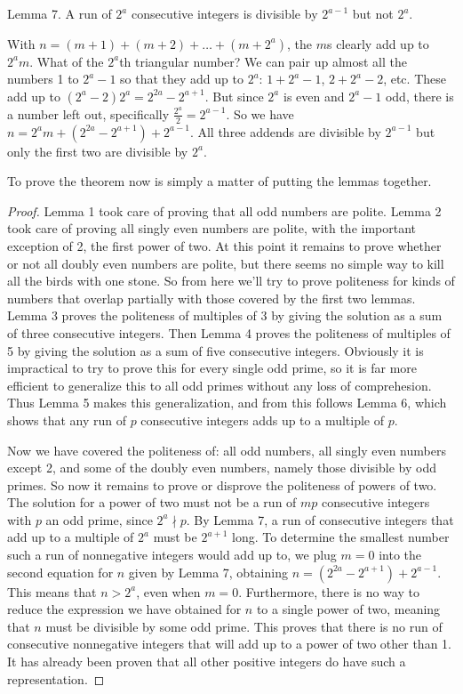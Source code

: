 \documentclass[12pt]{article}
\begin{document}
Lemma 7. A run of $2^a$ consecutive integers is divisible by $2^{a - 1}$ but not $2^a$.

With $n = (m + 1) + (m + 2) + \ldots + (m + 2^a)$, the $m$s clearly add up to $2^a m$. What of the $2^a$th triangular number? We can pair up almost all the numbers 1 to $2^a - 1$ so that they add up to $2^a$: $1 + 2^a - 1$, $2 + 2^a - 2$, etc. These add up to $(2^a - 2)2^a = 2^{2a} - 2^{a + 1}$. But since $2^a$ is even and $2^a - 1$ odd, there is a number left out, specifically $\frac{2^a}{2} = 2^{a - 1}$. So we have $n = 2^a m + (2^{2a} - 2^{a + 1}) + 2^{a - 1}$. All three addends are divisible by $2^{a - 1}$ but only the first two are divisible by $2^a$.

To prove the theorem now is simply a matter of putting the lemmas together.

\begin{proof}
Lemma 1 took care of proving that all odd numbers are polite. Lemma 2 took care of proving all singly even numbers are polite, with the important exception of 2, the first power of two. At this point it remains to prove whether or not all doubly even numbers are polite, but there seems no simple way to kill all the birds with one stone. So from here we'll try to prove politeness for kinds of numbers that overlap partially with those covered by the first two lemmas. Lemma 3 proves the politeness of multiples of 3 by giving the solution as a sum of three consecutive integers. Then Lemma 4 proves the politeness of multiples of 5 by giving the solution as a sum of five consecutive integers. Obviously it is impractical to try to prove this for every single odd prime, so it is far more efficient to generalize this to all odd primes without any loss of comprehesion. Thus Lemma 5 makes this generalization, and from this follows Lemma 6, which shows that any run of $p$ consecutive integers adds up to a multiple of $p$.

Now we have covered the politeness of: all odd numbers, all singly even numbers except 2, and some of the doubly even numbers, namely those divisible by odd primes. So now it remains to prove or disprove the politeness of powers of two. The solution for a power of two must not be a run of $mp$ consecutive integers with $p$ an odd prime, since $2^a \nmid p$. By Lemma 7, a run of consecutive integers that add up to a multiple of $2^a$ must be $2^{a + 1}$ long. To determine the smallest number such a run of nonnegative integers would add up to, we plug $m = 0$ into the second equation for $n$ given by Lemma 7, obtaining $n = (2^{2a} - 2^{a + 1}) + 2^{a - 1}$. This means that $n > 2^a$, even when $m = 0$. Furthermore, there is no way to reduce the expression we have obtained for $n$ to a single power of two, meaning that $n$ must be divisible by some odd prime. This proves that there is no run of consecutive nonnegative integers that will add up to a power of two other than 1. It has already been proven that all other positive integers do have such a representation.
\end{proof}
\end{document}
